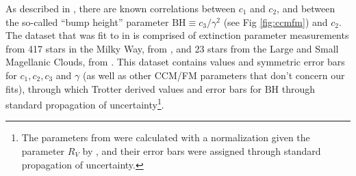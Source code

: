 As described in \textcite{trotter}, there are known correlations between $c_1$ and $c_2$, and between the so-called ``bump height'' parameter $\text{BH}\equiv c_3/\gamma^2$ (see Fig \ref{fig:ccmfm})  and $c_2$. The dataset that was fit to in \textcite{trotter} is comprised of extinction parameter measurements from 417 stars in the Milky Way, from \textcite{valencic04}, and 23 stars from the Large and Small Magellanic Clouds, from \textcite{gordon03}. This dataset contains values and symmetric error bars for $c_1, c_2, c_3$ and $\gamma$ (as well as other CCM/FM parameters that don't concern our fits), through which Trotter derived values and error bars for $\text{BH}$ through standard propagation of uncertainty\footnote{The parameters from \textcite{valencic04} were calculated with a normalization given the parameter $R_V$ by \textcite{trotter}, and their error bars were assigned through standard propagation of uncertainty.}. 


